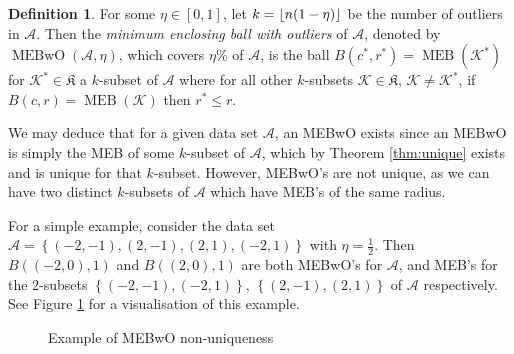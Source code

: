 \documentclass[11pt,twoside]{report}
\newcommand{\A}{\mathcal{A}} %
\newcommand{\K}{\mathcal{K}}
\DeclareMathOperator{\MEB}{MEB}
\DeclareMathOperator{\MEBwO}{MEBwO}
\DeclarePairedDelimiter\floor{\lfloor}{\rfloor}
\theoremstyle{definition}
\newtheorem{definition}{Definition}
\numberwithin{theorem}{section}
\numberwithin{definition}{section}
\numberwithin{lemma}{section}
\numberwithin{proposition}{section}
\numberwithin{equation}{section}
\numberwithin{figure}{section}
\begin{document}
\begin{definition}
    For some $\eta\in[0,1]$, let $k=\floor{n(1-\eta)}$ be the number of outliers in $\A$. Then the \textit{minimum enclosing ball with outliers} of $\A$, denoted by $\MEBwO(\A,\eta)$, which covers $\eta\%$ of $\A$, is the ball $B(c^*,r^*)=\MEB(\K^*)$ for $\K^*\in\mathfrak{K}$ a $k$-subset of $\A$ where for all other $k$-subsets $\K\in\mathfrak{K}$, $\K\neq\K^*$, if $B(c,r)=\MEB(\K)$ then $r^*\leq r$.
\end{definition}

We may deduce that for a given data set $\A$, an MEBwO exists since an MEBwO is simply the MEB of some $k$-subset of $\A$, which by Theorem \ref{thm:unique} exists and is unique for that $k$-subset. However, MEBwO's are not unique, as we can have two distinct $k$-subsets of $\A$ which have MEB's of the same radius.

For a simple example, consider the data set $\A=\left\{(-2,-1),(2,-1),(2,1),(-2,1)\right\}$ with $\eta=\frac{1}{2}$. Then $B((-2,0),1)$ and $B((2,0),1)$ are both MEBwO's for $\A$, and MEB's for the $2$-subsets $\left\{(-2,-1), (-2,1)\right\}$, $\left\{(2,-1), (2,1)\right\}$ of $\A$ respectively. See Figure \ref{fig:mebwo non-unique} for a visualisation of this example.

\begin{figure}
    \centering
    \caption{Example of MEBwO non-uniqueness}
    \label{fig:mebwo non-unique}
\end{figure}
\end{document}
